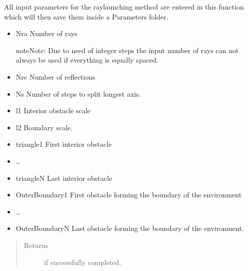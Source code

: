 \documentclass[letterpaper,10pt,english]{sphinxmanual}
\begin{document}

\begin{fulllineitems}
\label{\detokenize{index:ParameterInput.DeclareParameters}}
All input parameters for the ray\sphinxhyphen{}launching method are entered in
this function which will then save them inside a Parameters folder.
\begin{itemize}
\item {} 
Nra \sphinxhyphen{} Number of rays

\begin{sphinxadmonition}{note}{Note:}
Due to need of integer steps the input number of rays can not
always be used if everything is equally spaced.
\end{sphinxadmonition}

\item {} 
Nre \sphinxhyphen{} Number of reflections

\item {} 
Ns \sphinxhyphen{} Number of steps to split longest axis.

\item {} 
l1 \sphinxhyphen{} Interior obstacle scale

\item {} 
l2 \sphinxhyphen{} Boundary scale.

\item {} 
triangle1 \sphinxhyphen{} First interior obstacle

\item {} 
…

\item {} 
triangleN \sphinxhyphen{} Last interior obstacle

\item {} 
OuterBoundary1 \sphinxhyphen{} First obstacle forming the boundary of the   environment

\item {} 
…

\item {} 
OuterBoundaryN \sphinxhyphen{} Last obstacle forming the boundary of the   environment.

\end{itemize}
\begin{quote}\begin{description}
\item[{Returns}]  if successfully completed.

\end{description}\end{quote}

\end{fulllineitems}
\end{document}
